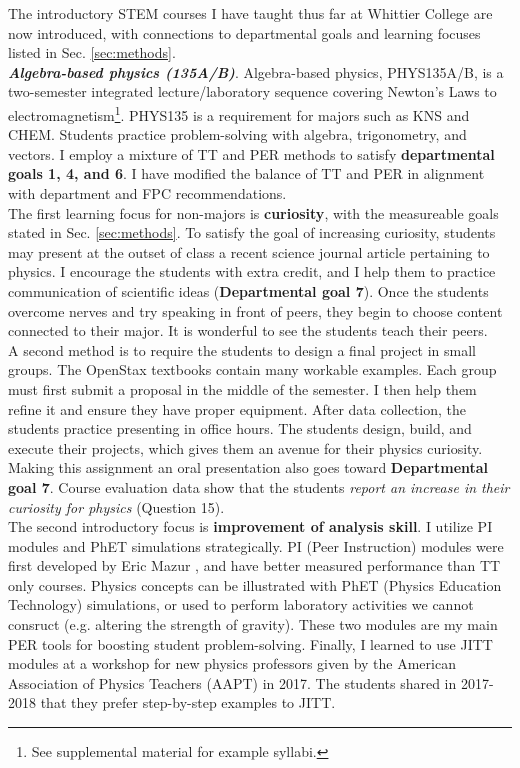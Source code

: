 \documentclass[../../../main.tex]{subfiles}
\begin{document}
The introductory STEM courses I have taught thus far at Whittier College are now introduced, with connections to departmental goals and learning focuses listed in Sec. \ref{sec:methods}.
\\
\vspace{0.25cm}
\textbf{\textit{Algebra-based physics (135A/B)}}. Algebra-based physics, PHYS135A/B, is a two-semester integrated lecture/laboratory sequence covering Newton's Laws to electromagnetism\footnote{See supplemental material for example syllabi.}.  PHYS135 is a requirement for majors such as KNS and CHEM.  Students practice problem-solving with algebra, trigonometry, and vectors.  I employ a mixture of TT and PER methods to satisfy \textbf{departmental goals 1, 4, and 6}.  I have modified the balance of TT and PER in alignment with department and FPC recommendations.
\\
\vspace{0.25cm}
The first learning focus for non-majors is \textbf{curiosity}, with the measureable goals stated in Sec. \ref{sec:methods}.  To satisfy the goal of increasing curiosity, students may present at the outset of class a recent science journal article pertaining to physics.  I encourage the students with extra credit, and I help them to practice communication of scientific ideas (\textbf{Departmental goal 7}).  Once the students overcome nerves and try speaking in front of peers, they begin to choose content connected to their major.  It is wonderful to see the students teach their peers.
\\
\vspace{0.25cm}
A second method is to require the students to design a final project in small groups.  The OpenStax textbooks contain many workable examples.  Each group must first submit a proposal in the middle of the semester.  I then help them refine it and ensure they have proper equipment.  After data collection, the students practice presenting in office hours.  The students design, build, and execute their projects, which gives them an avenue for their physics curiosity.  Making this assignment an oral presentation also goes toward \textbf{Departmental goal 7}.  Course evaluation data show that the students \textit{report an increase in their curiosity for physics} (Question 15).
\\
\vspace{0.25cm}
The second introductory focus is \textbf{improvement of analysis skill}.  I utilize PI modules and PhET simulations strategically.  PI (Peer Instruction) modules were first developed by Eric Mazur \cite{mazur2013peer}, and have better measured performance than TT only courses.  Physics concepts can be illustrated with PhET (Physics Education Technology) simulations, or used to perform laboratory activities we cannot consruct (e.g. altering the strength of gravity)\cite{phet}.  These two modules are my main PER tools for boosting student problem-solving.  Finally, I learned to use JITT modules \cite{jitt} at a workshop for new physics professors given by the American Association of Physics Teachers (AAPT) in 2017.  The students shared in 2017-2018 that they prefer step-by-step examples to JITT.
\end{document}
